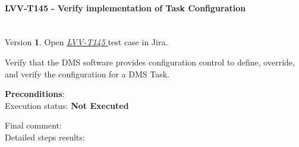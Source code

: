 \documentclass[DM,lsstdraft,STR,toc]{lsstdoc}
\begin{document}
\paragraph{ LVV-T145 - Verify implementation of Task Configuration }\mbox{}\\

Version \textbf{1}.
Open  \href{https://jira.lsstcorp.org/secure/Tests.jspa#/testCase/LVV-T145}{\textit{ LVV-T145 } }
test case in Jira.

Verify that the DMS software provides configuration control to define,
override, and verify the configuration for a DMS Task.

\textbf{ Preconditions}:\\


Execution status: {\bf Not Executed }

Final comment:\\


Detailed steps results:
\end{document}
